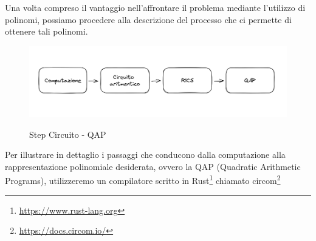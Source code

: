 Una volta compreso il vantaggio nell'affrontare il problema mediante l'utilizzo di polinomi, possiamo
procedere alla descrizione del processo che ci permette di ottenere tali polinomi.

\begin{figure}[H]
    \centering
    \includegraphics[width=14cm]{./chapters/1.state-of-art/images/8.comp_qap.png}
    \label{fig:comp-qap}
    \captionsetup{justification=centering}
    \caption{Step Circuito - QAP}
\end{figure}

Per illustrare in dettaglio i passaggi che conducono dalla computazione alla rappresentazione polinomiale desiderata,
ovvero la QAP (Quadratic Arithmetic Programs), utilizzeremo un compilatore scritto in Rust\footnote{\url{https://www.rust-lang.org}} chiamato circom\footnote{\url{https://docs.circom.io/}}

